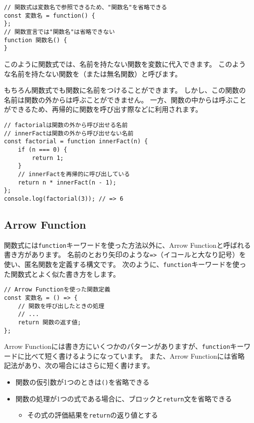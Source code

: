 \begin{lstlisting}
// 関数式は変数名で参照できるため、"関数名"を省略できる
const 変数名 = function() {
};
// 関数宣言では"関数名"は省略できない
function 関数名() {
}
\end{lstlisting}

このように関数式では、名前を持たない関数を変数に代入できます。
このような名前を持たない関数を\textbf{}（または無名関数）と呼びます。

もちろん関数式でも関数に名前をつけることができます。
しかし、この関数の名前は関数の外からは呼ぶことができません。
一方、関数の中からは呼ぶことができるため、再帰的に関数を呼び出す際などに利用されます。

\begin{lstlisting}
// factorialは関数の外から呼び出せる名前
// innerFactは関数の外から呼び出せない名前
const factorial = function innerFact(n) {
    if (n === 0) {
        return 1;
    }
    // innerFactを再帰的に呼び出している
    return n * innerFact(n - 1);
};
console.log(factorial(3)); // => 6
\end{lstlisting}

\hypertarget{arrow-function}{%
\subsection[Arrow Function]{Arrow Function\,\protect{}}\label{arrow-function}}

関数式には\texttt{function}キーワードを使った方法以外に、Arrow
Functionと呼ばれる書き方があります。
名前のとおり矢印のような\texttt{=>}（イコールと大なり記号）を使い、匿名関数を定義する構文です。
次のように、\texttt{function}キーワードを使った関数式とよく似た書き方をします。

\begin{lstlisting}
// Arrow Functionを使った関数定義
const 変数名 = () => {
    // 関数を呼び出したときの処理
    // ...
    return 関数の返す値;
};
\end{lstlisting}

Arrow
Functionには書き方にいくつかのパターンがありますが、\texttt{function}キーワードに比べて短く書けるようになっています。
また、Arrow Functionには省略記法があり、次の場合にはさらに短く書けます。

\begin{itemize}
\item
  関数の仮引数が1つのときは\texttt{()}を省略できる
\item
  関数の処理が1つの式である場合に、ブロックと\texttt{return}文を省略できる

  \begin{itemize}
  \item
    その式の評価結果を\texttt{return}の返り値とする
  \end{itemize}
\end{itemize}

